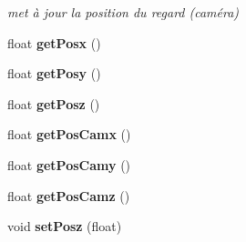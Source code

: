 \begin{DoxyCompactItemize}
\begin{DoxyCompactList}\small\item\em met à jour la position du regard (caméra) \end{DoxyCompactList}\item 
\hypertarget{classJoueur_a49cea54853cb00bfa6d202e85c28b423}{float {\bfseries get\-Posx} ()}\label{classJoueur_a49cea54853cb00bfa6d202e85c28b423}

\item 
\hypertarget{classJoueur_a0603bac92c9d01c2ffd41458cdfc0e12}{float {\bfseries get\-Posy} ()}\label{classJoueur_a0603bac92c9d01c2ffd41458cdfc0e12}

\item 
\hypertarget{classJoueur_a95ed54abb559304fb3cb0af4aa66ba9b}{float {\bfseries get\-Posz} ()}\label{classJoueur_a95ed54abb559304fb3cb0af4aa66ba9b}

\item 
\hypertarget{classJoueur_a09fa10f7ae974b01ce1b7cb368e4bb95}{float {\bfseries get\-Pos\-Camx} ()}\label{classJoueur_a09fa10f7ae974b01ce1b7cb368e4bb95}

\item 
\hypertarget{classJoueur_a8b87552f137fb3db5113ef179b38513c}{float {\bfseries get\-Pos\-Camy} ()}\label{classJoueur_a8b87552f137fb3db5113ef179b38513c}

\item 
\hypertarget{classJoueur_a794e13d55e087458595f01390d35525d}{float {\bfseries get\-Pos\-Camz} ()}\label{classJoueur_a794e13d55e087458595f01390d35525d}

\item 
\hypertarget{classJoueur_a5f07d780788f070ac9a03654e354baef}{void {\bfseries set\-Posz} (float)}\label{classJoueur_a5f07d780788f070ac9a03654e354baef}

\end{DoxyCompactItemize}
